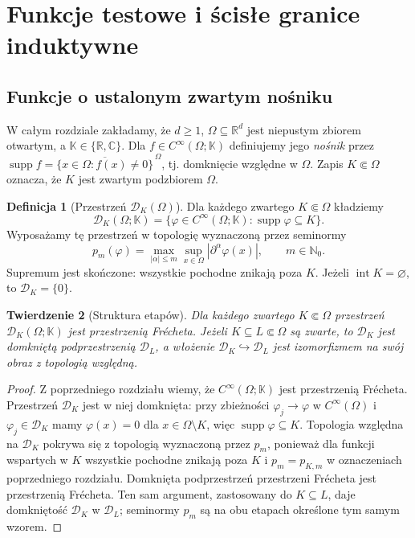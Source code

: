 \documentclass[11pt,a4paper]{article}
\numberwithin{equation}{section}
\theoremstyle{plain}
\newtheorem{twierdzenie}{Twierdzenie}[section]
\theoremstyle{definition}
\newtheorem{definicja}[twierdzenie]{Definicja}
\theoremstyle{remark}
\newcommand{\R}{\mathbb R}
\newcommand{\C}{\mathbb C}
\newcommand{\N}{\mathbb N}
\newcommand{\K}{\mathbb K}
\DeclareMathOperator{\supp}{supp}
\begin{document}
\setcounter{section}{17}
\section{Funkcje testowe i ścisłe granice induktywne}
\label{sec:funkcje-testowe18}

\subsection{Funkcje o ustalonym zwartym nośniku}

W całym rozdziale zakładamy, że $d\ge1$, $\Omega\subseteq\R^d$
jest niepustym zbiorem otwartym, a $\K\in\{\R,\C\}$.
Dla $f\in C^\infty(\Omega;\K)$ definiujemy jego \emph{nośnik}
przez $\supp f=\overline{\{x\in\Omega:f(x)\ne0\}}^{\,\Omega}$,
tj. domknięcie względne w $\Omega$. Zapis $K\Subset\Omega$
oznacza, że $K$ jest zwartym podzbiorem $\Omega$.

\begin{definicja}[Przestrzeń $\mathcal D_K(\Omega)$]
\label{def:DK18}
Dla każdego zwartego $K\Subset\Omega$ kładziemy
\[
 \mathcal D_K(\Omega;\K)=\{\varphi\in C^\infty(\Omega;\K):
 \supp\varphi\subseteq K\}.
\]
Wyposażamy tę przestrzeń w topologię wyznaczoną przez seminormy
\[p_m(\varphi)=\max_{|\alpha|\le m}\sup_{x\in\Omega}
|\partial^\alpha\varphi(x)|,\qquad m\in\N_0.\]
Supremum jest skończone: wszystkie pochodne znikają poza $K$.
Jeżeli $\operatorname{int}K=\varnothing$, to $\mathcal D_K=\{0\}$.
\end{definicja}

\begin{twierdzenie}[Struktura etapów]
\label{thm:DK-frechet18}
Dla każdego zwartego $K\Subset\Omega$ przestrzeń
$\mathcal D_K(\Omega;\K)$ jest przestrzenią Fr\'echeta.
Jeżeli $K\subseteq L\Subset\Omega$ są zwarte, to
$\mathcal D_K$ jest domkniętą podprzestrzenią $\mathcal D_L$,
a włożenie $\mathcal D_K\hookrightarrow\mathcal D_L$
jest izomorfizmem na swój obraz z topologią względną.
\end{twierdzenie}
\begin{proof}
Z poprzedniego rozdziału wiemy, że
$C^\infty(\Omega;\K)$ jest przestrzenią Fr\'echeta.
Przestrzeń $\mathcal D_K$ jest w niej domknięta:
przy zbieżności $\varphi_j\to\varphi$ w $C^\infty(\Omega)$
i $\varphi_j\in\mathcal D_K$ mamy $\varphi(x)=0$ dla
$x\in\Omega\setminus K$, więc $\supp\varphi\subseteq K$.
Topologia względna na $\mathcal D_K$ pokrywa się z topologią
wyznaczoną przez $p_m$, ponieważ dla funkcji wspartych w $K$
wszystkie pochodne znikają poza $K$ i $p_m=p_{K,m}$
w oznaczeniach poprzedniego rozdziału.
Domknięta podprzestrzeń przestrzeni Fr\'echeta jest przestrzenią
Fr\'echeta. Ten sam argument, zastosowany do $K\subseteq L$,
daje domkniętość $\mathcal D_K$ w $\mathcal D_L$;
seminormy $p_m$ są na obu etapach określone tym samym wzorem.
\end{proof}
\end{document}
